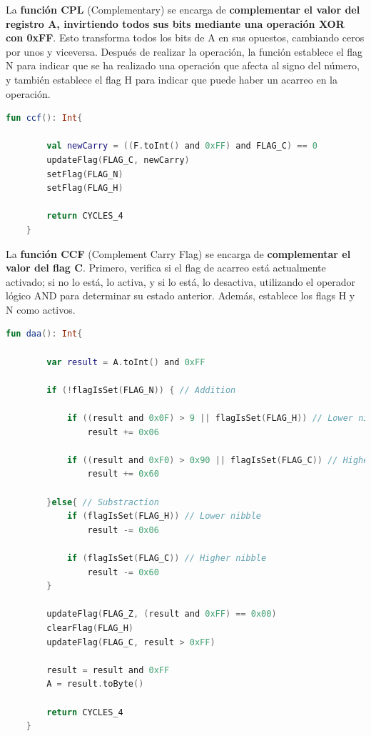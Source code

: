 La \textbf{función CPL} (Complementary) se encarga de \textbf{complementar el valor del registro A, invirtiendo todos sus bits mediante una operación XOR con 0xFF}. Esto transforma todos los bits de A en sus opuestos, cambiando ceros por unos y viceversa. Después de realizar la operación, la función establece el flag N para indicar que se ha realizado una operación que afecta al signo del número, y también establece el flag H para indicar que puede haber un acarreo en la operación.
\cleardoubleevenpage
\begin{lstlisting}[language=Kotlin, caption={Operación CCF}, label={code:kotlinccf}]
    fun ccf(): Int{

        val newCarry = ((F.toInt() and 0xFF) and FLAG_C) == 0
        updateFlag(FLAG_C, newCarry)
        setFlag(FLAG_N)
        setFlag(FLAG_H)

        return CYCLES_4
    }
\end{lstlisting}

La \textbf{función CCF} (Complement Carry Flag) se encarga de \textbf{complementar el valor del flag C}. Primero, verifica si el flag de acarreo está actualmente activado; si no lo está, lo activa, y si lo está, lo desactiva, utilizando el operador lógico AND para determinar su estado anterior. Además, establece los flags H y N como activos.

\begin{lstlisting}[language=Kotlin, caption={Operación DAA}, label={code:kotlindaa}]
    fun daa(): Int{

        var result = A.toInt() and 0xFF

        if (!flagIsSet(FLAG_N)) { // Addition

            if ((result and 0x0F) > 9 || flagIsSet(FLAG_H)) // Lower nibble
                result += 0x06

            if ((result and 0xF0) > 0x90 || flagIsSet(FLAG_C)) // Higher nibble
                result += 0x60

        }else{ // Substraction
            if (flagIsSet(FLAG_H)) // Lower nibble
                result -= 0x06

            if (flagIsSet(FLAG_C)) // Higher nibble
                result -= 0x60
        }

        updateFlag(FLAG_Z, (result and 0xFF) == 0x00)
        clearFlag(FLAG_H)
        updateFlag(FLAG_C, result > 0xFF)

        result = result and 0xFF
        A = result.toByte()

        return CYCLES_4
    }
\end{lstlisting}

